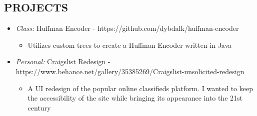 \documentclass[margin]{res}
\begin{document}
\begin{resume}
                                        
                						 	 
\section{PROJECTS} \begin{itemize}
	\item {\sl Class:} Huffman Encoder - https://github.com/dybdalk/huffman-encoder
	\begin{itemize}
	\item Utilizes custom trees to create a Huffman Encoder written in Java

	\end{itemize}
	\item {\sl Personal:} Craigslist Redesign - https://www.behance.net/gallery/35385269/Craigslist-unsolicited-redesign
	\begin{itemize}
	\item A UI redesign of the popular online classifieds platform. I wanted to keep the accessibility of the site while bringing its appearance into the 21st century
	\end{itemize}
	
\end{itemize}						

\end{resume}
\end{document}
